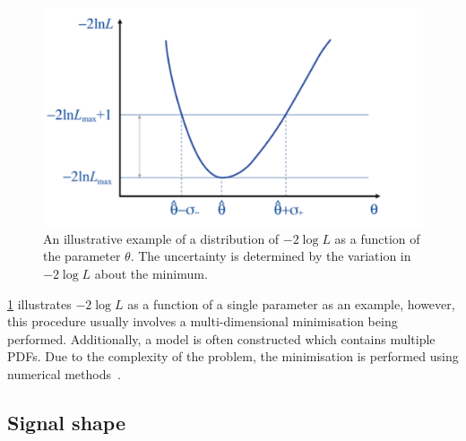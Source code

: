 \begin{figure}
\centering
\includegraphics[width=0.7\linewidth]{figures/fitComponents/likelihood.pdf}
\caption{An illustrative example of a distribution of $-2\log L$ as a function of the parameter $\theta$. The uncertainty is determined by the variation in $-2\log L$ about the minimum.}
\label{fig:likelihood}
\end{figure}

\Fig\ref{fig:likelihood} illustrates $-2\log L$ as a function of a single parameter as an example, however, this procedure usually involves a multi-dimensional minimisation being performed. Additionally, a model is often constructed which contains multiple PDFs. Due to the complexity of the problem, the minimisation is performed using numerical methods~\cite{minuit}.


\subsection{Signal shape}
\label{sec:massfit:signal}


